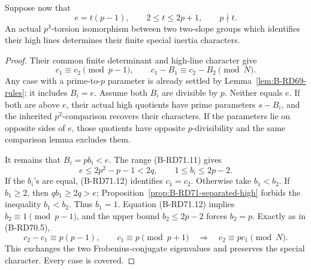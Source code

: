 \begin{proposition}
\label{prop:B-RD71-common-high}
Suppose now that
\[
 e=t(p-1),\qquad 2\le t\le2p+1,\qquad p\nmid t.
 \tag{B-RD71.11}
\]
An actual \(p^3\)-torsion isomorphism between two two-slope
groups which identifies their high lines determines their
finite special inertia characters.
\end{proposition}
\begin{proof}
Their common finite determinant and high-line character give
\[
 c_1\equiv c_2\pmod{p-1},\qquad
 c_1-B_1\equiv c_2-B_2\pmod N.
 \tag{B-RD71.12}
\]
Any case with a prime-to-\(p\) parameter is already settled
by Lemma~\ref{lem:B-RD69-rules}; it includes \(B_i=e\).
Assume both \(B_i\) are divisible by \(p\).
Neither equals \(e\). If both are above \(e\), their actual
high quotients have prime parameters \(s-B_i\), and the
inherited \(p^2\)-comparison recovers their characters.
If the parameters lie on opposite sides of \(e\), those
quotients have opposite \(p\)-divisibility and the same
comparison lemma excludes them.

It remains that \(B_i=pb_i<e\). The range (B-RD71.11) gives
\[
 e\le2p^2-p-1<2q,\qquad 1\le b_i\le2p-2.
 \tag{B-RD71.13}
\]
If the \(b_i\)'s are equal, (B-RD71.12) identifies \(c_1=c_2\).
Otherwise take \(b_1<b_2\).
If \(b_1\ge2\), then \(qb_1\ge2q>e\);
Proposition~\ref{prop:B-RD71-separated-high} forbids the
inequality \(b_1<b_2\).
Thus \(b_1=1\).
Equation (B-RD71.12) implies \(b_2\equiv1\pmod{p-1}\),
and the upper bound \(b_2\le2p-2\) forces \(b_2=p\).
Exactly as in (B-RD70.5),
\[
 c_2-c_1\equiv p(p-1),\qquad
 c_1\equiv p\pmod{p+1}
 \quad\Longrightarrow\quad c_2\equiv pc_1\pmod N.
 \tag{B-RD71.14}
\]
This exchanges the two Frobenius-conjugate eigenvalues
and preserves the special character. Every case is covered.
\end{proof}

